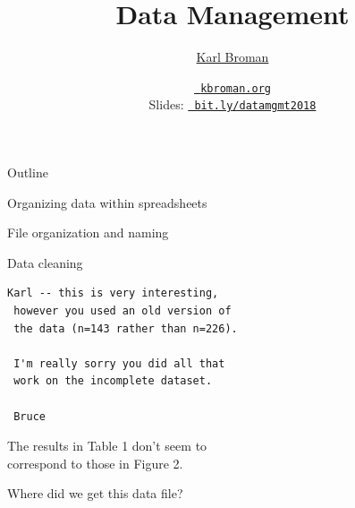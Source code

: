 \documentclass[12pt,t]{beamer}
\title{Data Management}
\author{\href{https://kbroman.org}{Karl Broman}}
\institute{Biostatistics \& Medical Informatics \\ Univ.\ Wisconsin{\textendash}Madison}
\date{\href{https://kbroman.org}{\tt \scriptsize \color{foreground} kbroman.org}
\\[2pt]
\scriptsize {\lolit Slides:} \href{https://bit.ly/datamgmt2018}{\tt \scriptsize
  \color{foreground} bit.ly/datamgmt2018}
}
\begin{document}
{
 }


\begin{frame}[c]{Outline}

  \bbi
\item Organizing data within spreadsheets
\item File organization and naming
\item Data cleaning
  \ei

\end{frame}



\begin{frame}[fragile,c]{}

\begin{center}
\begin{minipage}[c]{9.3cm}
\begin{semiverbatim}
\lstset{basicstyle=\normalsize}
\begin{lstlisting}[linewidth=9.3cm]
 Karl -- this is very interesting,
 however you used an old version of
 the data (n=143 rather than n=226).

 I'm really sorry you did all that
 work on the incomplete dataset.

 Bruce
\end{lstlisting}
\end{semiverbatim}
\end{minipage}
\end{center}

\end{frame}


\begin{frame}[c]{}
\centering
{\Large The results in Table 1 don't seem to \\[12pt]
correspond to those in Figure 2.}

\end{frame}



\begin{frame}[c]{}
\centerline{\Large Where did we get this data file?}
\end{frame}
\end{document}
